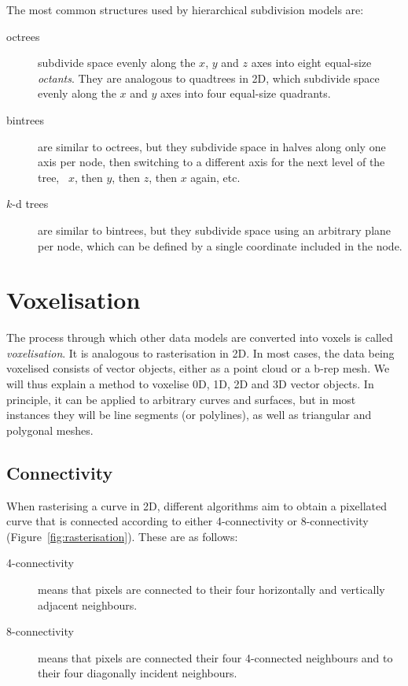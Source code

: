The most common structures used by hierarchical subdivision models are:

\begin{description}

\item[octrees] subdivide space evenly along the \(x\), \(y\) and \(z\) axes into eight equal-size \emph{octants}.
They are analogous to quadtrees in 2D, which subdivide space evenly along the \(x\) and \(y\) axes into four equal-size quadrants.

\item[bintrees] are similar to octrees, but they subdivide space in halves along only one axis per node, then switching to a different axis for the next level of the tree, \eg\ \(x\), then \(y\), then \(z\), then \(x\) again, etc.

\item[\(k\)-d trees] are similar to bintrees, but they subdivide space using an arbitrary plane per node, which can be defined by a single coordinate included in the node.

\end{description}

\section{Voxelisation}

The process through which other data models are converted into voxels is called \emph{voxelisation}.
It is analogous to rasterisation in 2D.
In most cases, the data being voxelised consists of vector objects, either as a point cloud or a b-rep mesh.
We will thus explain a method to voxelise 0D, 1D, 2D and 3D vector objects.
In principle, it can be applied to arbitrary curves and surfaces, but in most instances they will be line segments (or polylines), as well as triangular and polygonal meshes.

\subsection{Connectivity}

When rasterising a curve in 2D, different algorithms aim to obtain a pixellated curve that is connected according to either 4-connectivity or 8-connectivity (Figure~\ref{fig:rasterisation}).
These are as follows:
\begin{description}
\item[4-connectivity] means that pixels are connected to their four horizontally and vertically adjacent neighbours.
\item[8-connectivity] means that pixels are connected their four 4-connected neighbours and to their four diagonally incident neighbours.
\end{description}

